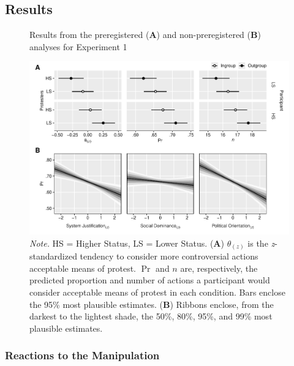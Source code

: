 \documentclass[12pt, letterpaper]{article}
\begin{document}
\hypertarget{results}{%
\subsection{Results}\label{results}}

\begin{figure}[!t]
\centering
\caption{Results from the preregistered (\textbf{A}) and non-preregistered (\textbf{B}) analyses for Experiment 1}
\includegraphics[scale=1]{../Experiment 1/figures/figure-3}
\caption*{\textit{Note.} HS = Higher Status, LS = Lower Status. (\textbf{A}) $\theta_{(z)}$ is the \textit{z}-standardized tendency to consider more controversial actions acceptable means of protest. $\Pr$ and $n$ are, respectively, the predicted proportion and number of actions a participant would consider acceptable means of protest in each condition. Bars enclose the 95\% most plausible estimates. (\textbf{B}) Ribbons enclose, from the darkest to the lightest shade, the 50\%, 80\%, 95\%, and 99\% most plausible estimates.}
\label{fig:f3}
\end{figure}

\hypertarget{reactions-to-the-manipulation}{%
\subsubsection{Reactions to the
Manipulation}\label{reactions-to-the-manipulation}}
\end{document}
